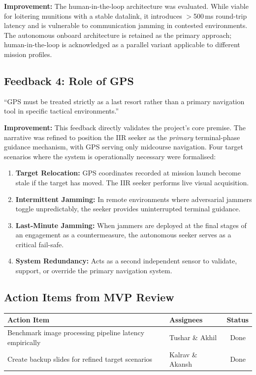 \documentclass[12pt,a4paper]{article}
\newcommand{\chk}{\textcolor{StatusGreen}{\ding{52}}}
\begin{document}
\textbf{Improvement:} The human-in-the-loop architecture was evaluated. While viable for loitering munitions with a stable datalink, it introduces $>$500\,ms round-trip latency and is vulnerable to communication jamming in contested environments. The autonomous onboard architecture is retained as the primary approach; human-in-the-loop is acknowledged as a parallel variant applicable to different mission profiles.

\subsection{Feedback 4: Role of GPS}

\begin{feedbackbox}
``GPS must be treated strictly as a last resort rather than a primary navigation tool in specific tactical environments.''
\end{feedbackbox}

\textbf{Improvement:} This feedback directly validates the project's core premise. The narrative was refined to position the IIR seeker as the \textit{primary} terminal-phase guidance mechanism, with GPS serving only midcourse navigation. Four target scenarios where the system is operationally necessary were formalised:

\begin{enumerate}[itemsep=4pt]
  \item \textbf{Target Relocation:} GPS coordinates recorded at mission launch become stale if the target has moved. The IIR seeker performs live visual acquisition.
  \item \textbf{Intermittent Jamming:} In remote environments where adversarial jammers toggle unpredictably, the seeker provides uninterrupted terminal guidance.
  \item \textbf{Last-Minute Jamming:} When jammers are deployed at the final stages of an engagement as a countermeasure, the autonomous seeker serves as a critical fail-safe.
  \item \textbf{System Redundancy:} Acts as a second independent sensor to validate, support, or override the primary navigation system.
\end{enumerate}

\subsection{Action Items from MVP Review}

\begin{center}
\renewcommand{\arraystretch}{1.3}
\begin{tabular}{L{7.5cm} C{2.8cm} C{2cm}}
\toprule
{}
\textbf{Action Item} & \textbf{Assignees} & \textbf{Status} \\
\midrule
Benchmark image processing pipeline latency empirically & Tushar \& Akhil & \chk\ Done \\
Create backup slides for refined target scenarios & Kalrav \& Akansh & \chk\ Done \\
\bottomrule
\end{tabular}
\end{center}
\end{document}
